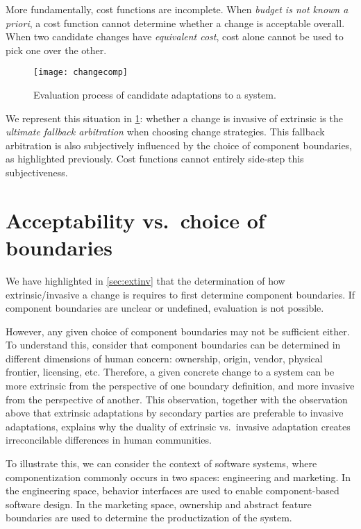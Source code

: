 \documentclass[a4paper]{article}
\newcommand{\vs}{vs.~}
\begin{document}
More fundamentally, cost functions are incomplete. When \emph{budget is
  not known \textsl{a priori}}, a cost function cannot determine
whether a change is acceptable overall. When two candidate changes
have \emph{equivalent cost}, cost alone cannot be used to pick one
over the other.

\begin{figure}
\hspace{-.2\textwidth}\texttt{[image: changecomp]}
\caption{Evaluation process of candidate adaptations to a system.}\label{fig:changecomp}
\end{figure}

We represent this situation in \cref{fig:changecomp}: whether a change
is invasive of extrinsic is the \emph{ultimate fallback arbitration}
when choosing change strategies. This fallback arbitration is also
subjectively influenced by the choice of component boundaries, as
highlighted previously. Cost functions cannot entirely
side-step this subjectiveness.


\section{Acceptability \vs choice of boundaries}\label{sec:acc}

We have highlighted in \cref{sec:extinv} that the determination of how
extrinsic/invasive a change is requires to first determine component
boundaries. If component boundaries are unclear or undefined,
evaluation is not possible.

However, any given choice of component boundaries may not be
sufficient either.  To understand this, consider that component
boundaries can be determined in different dimensions of human concern:
ownership, origin, vendor, physical frontier, licensing, etc.
Therefore, a given concrete change to a system can be more extrinsic from the
perspective of one boundary definition, and more invasive from the
perspective of another. This observation, together with
the observation above that extrinsic adaptations by secondary parties
are preferable to invasive adaptations, explains why the duality of
extrinsic \vs invasive adaptation creates irreconcilable differences
in human communities.

To illustrate this, we can consider the context of software systems,
where componentization commonly occurs in two spaces: engineering and
marketing. In the engineering space, behavior interfaces are used to
enable component-based software design. In the marketing space,
ownership and abstract feature boundaries\footnotemark{} are used to determine the
productization of the system.
\end{document}
